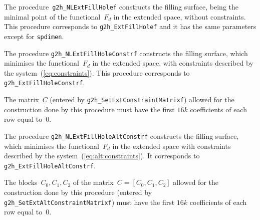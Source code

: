 \vspace{\bigskipamount}
The procedure~\texttt{g2h\_NLExtFillHolef} constructs the filling surface,
being the minimal point of the functional~$F_d$ in the extended space, without
constraints. This procedure corresponds to \texttt{g2h\_ExtFillHolef}
and it has the same parameters except for \texttt{spdimen}.

\vspace{\bigskipamount}
\begin{sloppypar}
The procedure \texttt{g2h\_NLExtFillHoleConstrf} constructs the filling surface,
which minimises the functional~$F_d$ in the extended space, with constraints
described by the system~(\ref{eq:constraints}). This procedure
corresponds to \texttt{g2h\_ExtFillHoleConstrf}.%
\end{sloppypar}

The matrix~$C$ (entered by \texttt{g2h\_SetExtConstraintMatrixf})
allowed for the construction done by this procedure
must have the first $16k$ coefficients of each row equal to~$0$.

\vspace{\bigskipamount}
The procedure \texttt{g2h\_NLExtFillHoleAltConstrf} constructs the filling
surface, which minimises the functional~$F_d$ in the extended space with
constraints described by the system~(\ref{eq:alt:constraints}). It corresponds
to \texttt{g2h\_ExtFillHoleAltConstrf}.

The blocks~$C_0,C_1,C_2$ of the matrix~$C=[C_0,C_1,C_2]$ allowed for the
construction done by this procedure (entered by
\texttt{g2h\_SetExtAltConstraintMatrixf}) must have the first $16k$ coefficients
of each row equal to~$0$.

